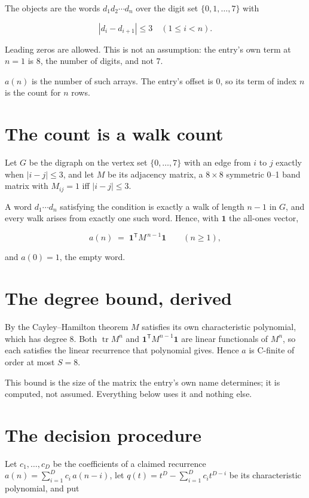 \documentclass[11pt]{article}
\theoremstyle{definition}
\begin{document}
The objects are the words $d_1 d_2 \cdots d_n$ over the digit set $\{0,1,\dots,7\}$ with

\[|d_i - d_{i+1}| \le 3\quad (1 \le i < n).\]

Leading zeros are allowed. This is not an assumption: the entry's own term at $n=1$ is $8$, the number of digits, and not $7$.

$a(n)$ is the number of such arrays. The entry's offset is 0, so its term of index $n$ is the count for $n$ rows.

\section{The count is a walk count}

Let $G$ be the digraph on the vertex set $\{0,\dots,7\}$ with an edge from $i$ to $j$ exactly when $|i-j| \le 3$, and let $M$ be its adjacency matrix, a $8 \times 8$ symmetric 0--1 band matrix with $M_{ij} = 1$ iff $|i-j| \le 3$.

A word $d_1\cdots d_n$ satisfying the condition is exactly a walk of length $n-1$ in $G$, and every walk arises from exactly one such word. Hence, with $\mathbf 1$ the all-ones vector,

\[a(n) \;=\; \mathbf 1^{\mathsf T} M^{\,n-1} \mathbf 1 \qquad (n \ge 1),\]

and $a(0) = 1$, the empty word.

\section{The degree bound, derived}

By the Cayley--Hamilton theorem $M$ satisfies its own characteristic polynomial, which has degree $8$. Both $\operatorname{tr} M^n$ and $\mathbf 1^{\mathsf T} M^{n-1} \mathbf 1$ are linear functionals of $M^{n}$, so each satisfies the linear recurrence that polynomial gives. Hence $a$ is C-finite of order at most $S = 8$.

This bound is the size of the matrix the entry's own name determines; it is computed, not assumed. Everything below uses it and nothing else.

\section{The decision procedure}

Let $c_1,\dots,c_D$ be the coefficients of a claimed recurrence $a(n) = \sum_{i=1}^{D} c_i\,a(n-i)$, let $q(t) = t^{D} - \sum_{i=1}^{D} c_i t^{D-i}$ be its characteristic polynomial, and put
\end{document}

